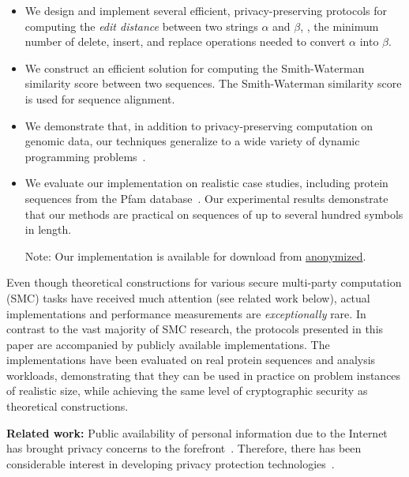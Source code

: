 \begin{itemize}

\item 
We design and implement several efficient, privacy-preserving protocols
for computing the \emph{edit distance} between two strings $\alpha$
and $\beta$, \ie, the minimum number of {\sf delete}, {\sf insert},
and {\sf replace} operations needed to convert $\alpha$ into $\beta$.

\item
We construct an efficient solution for computing the Smith-Waterman~\cite{Smith-Waterman}
similarity score between two sequences. The Smith-Waterman similarity score is used for
sequence alignment.

\item
We demonstrate that, in addition to privacy-preserving computation on
genomic data, our techniques generalize to a wide variety of dynamic
programming problems~\cite[Chapter 15]{CLR}.

\item
We evaluate our implementation on realistic case studies, including
protein sequences from the Pfam database~\cite{pfam2002}.  Our experimental results
demonstrate that our methods are practical on sequences of up to several
hundred symbols in length.

{\sf Note:}
Our implementation is available for download from \url{anonymized}.

\end{itemize}

Even though theoretical constructions for various secure multi-party
computation (SMC) tasks have received much attention (see related
work below), actual implementations and performance measurements
are \emph{exceptionally} rare.  In contrast to the vast majority of
SMC research, the protocols presented in this paper are accompanied
by publicly available implementations.  The implementations have been
evaluated on real protein sequences and analysis workloads, demonstrating
that they can be used in practice on problem instances of realistic size,
while achieving the same level of cryptographic security as theoretical
constructions.

\vspace{1ex}
\noindent
\textbf{Related work:} 
Public availability of personal information due to the Internet has
brought privacy concerns to the forefront~\cite{cra99,tur03}.  Therefore,
there has been considerable interest in developing privacy protection
technologies~\cite{p3p02,gwb97,rks+97}.

